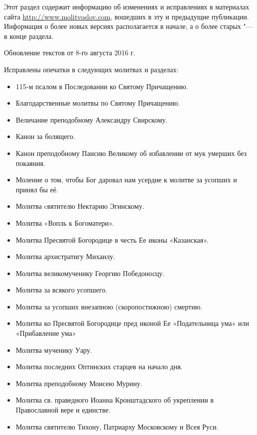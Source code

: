 \renewcommand{\ornament}{uzor_begin_9}

Этот раздел содержит информацию об изменениях и исправлениях в материалах сайта \url{http://www.molitvoslov.com}, вошедших в эту и предыдущие публикации. Информация о более новых версиях располагается в начале, а о более старых "--- в конце раздела.


Обновление текстов от 8-го августа 2016 г.

Исправлены опечатки в следующих молитвах и разделах:

\begin{itemize}

\item 115-м псалом в Последовании ко Святому Причащению.
\item Благодарственные молитвы по Святому Причащению.
\item Величание преподобному Александру Свирскому.
\item Канон за болящего.
\item Канон преподобному Паисию Великому об избавлении от мук умерших без покаяния.
\item Моление о том, чтобы Бог даровал нам усердие к молитве за усопших и принял бы её.
\item Молитва cвятителю Нектарию Эгинскому.
\item Молитва «Вопль к Богоматери».
\item Молитва Пресвятой Богородице в честь Ее иконы «Казанская».
\item Молитва архистратигу Михаилу.
\item Молитва великомученику Георгию Победоносцу.
\item Молитва за всякого усопшего.
\item Молитва за усопших внезапною (скоропостижною) смертию.
\item Молитва ко Пресвятой Богородице пред иконой Ее «Подательница ума» или «Прибавление ума»
\item Молитва мученику Уару.
\item Молитва последних Оптинских старцев на начало дня.
\item Молитва преподобному Моисею Мурину.
\item Молитва св. праведного Иоанна Кронштадского об укреплении в Православной вере и единстве.
\item Молитва святителю Тихону, Патриарху Московскому и Всея Руси.

\end{itemize}
